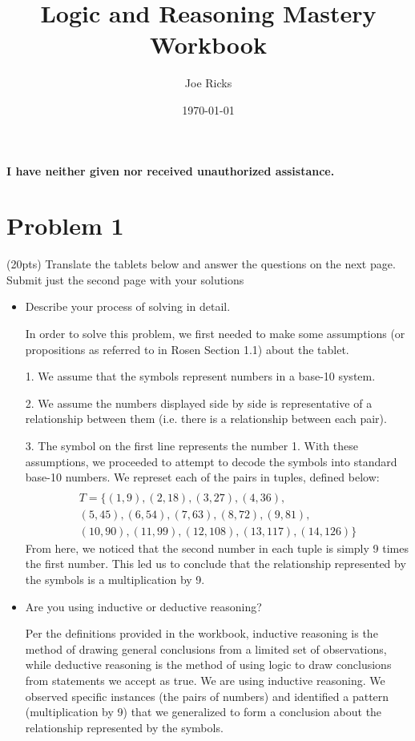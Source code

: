 \documentclass{article}
\title{Logic and Reasoning Mastery Workbook}
\author{Joe Ricks}
\date{\today}
\begin{document}
\maketitle

\textbf{\Huge I have neither given nor received unauthorized assistance.}

\clearpage
\section{Problem 1}

(20pts) Translate the tablets below and answer the questions on the next page.
Submit just the second page with your solutions

\begin{itemize}
    \item Describe your process of solving in detail.
    
    In order to solve this problem, we first needed to make some assumptions (or propositions as referred to in Rosen Section 1.1) about the tablet.

    1. We assume that the symbols represent numbers in a base-10 system. 

    2. We assume the numbers displayed side by side is representative of a relationship between them (i.e. there is a relationship between each pair).

    3. The symbol on the first line represents the number 1.
    With these assumptions, we proceeded to attempt to decode the symbols into standard base-10 numbers. We represet each of the pairs in tuples, defined below:
    \begin{align*}
        \\T = \{(1, 9), (2, 18), (3, 27), (4, 36),
        \\(5, 45), (6, 54), (7, 63), (8, 72), (9, 81), \\(10, 90), (11, 99), (12, 108), (13, 117), (14, 126)\}
    \end{align*}
    From here, we noticed that the second number in each tuple is simply 9 times the first number. This led us to conclude that the relationship represented by the symbols is a multiplication by 9.
    \item Are you using inductive or deductive reasoning?
    
    Per the definitions provided in the workbook, inductive reasoning is the method of drawing general conclusions from a limited set of observations, while deductive reasoning is the method of using logic to draw conclusions from statements we
accept as true. We are using inductive reasoning. We observed specific instances (the pairs of numbers) and identified a pattern (multiplication by 9) that we generalized to form a conclusion about the relationship represented by the symbols.
    

\end{itemize}
\end{document}
